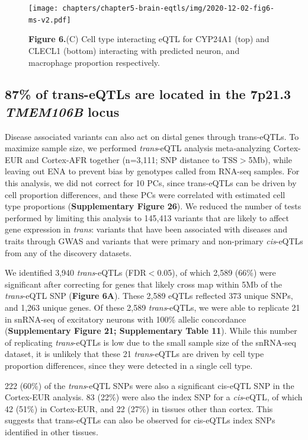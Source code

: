\begin{figure}[H]
	\texttt{[image: chapters/chapter5-brain-eqtls/img/2020-12-02-fig6-ms-v2.pdf]}
	\caption{\textbf{Figure 6.}(C) Cell type interacting eQTL for CYP24A1 (top) and CLECL1 (bottom) interacting with predicted neuron, and macrophage proportion respectively. }
\end{figure}

\subsection{87\% of trans-eQTLs are located in the 7p21.3 \emph{TMEM106B} locus }
Disease associated variants can also act on distal genes through trans-eQTLs. To maximize sample size, we performed \emph{trans}-eQTL analysis meta-analyzing Cortex-EUR and Cortex-AFR together (n=3,111; SNP distance to TSS$>$5Mb), while leaving out ENA to prevent bias by genotypes called from RNA-seq samples. For this analysis, we did not correct for 10 PCs, since trans-eQTLs can be driven by cell proportion differences\cite{vosaUnravelingPolygenicArchitecture2018}, and these PCs were correlated with estimated cell type proportions (\textbf{Supplementary Figure 26}). We reduced the number of tests performed by limiting this analysis to 145,413 variants that are likely to affect gene expression in \emph{trans}: variants that have been associated with diseases and traits through GWAS and variants that were primary and non-primary \emph{cis}-eQTLs from any of the discovery datasets.  

We identified 3,940 \emph{trans}-eQTLs (FDR$<$0.05), of which 2,589 (66\%) were significant after correcting for genes that likely cross map within 5Mb of the \emph{trans}-eQTL SNP (\textbf{Figure 6A}). These 2,589 eQTLs reflected 373 unique SNPs, and 1,263 unique genes. Of these 2,589 \emph{trans}-eQTLs, we were able to replicate 21 in snRNA-seq of excitatory neurons with 100\% allelic concordance (\textbf{Supplementary Figure 21; Supplementary Table 11}). While this number of replicating \emph{trans}-eQTLs is low due to the small sample size of the snRNA-seq dataset, it is unlikely that these 21 \emph{trans}-eQTLs are driven by cell type proportion differences, since they were detected in a single cell type. 

222 (60\%) of the \emph{trans}-eQTL SNPs were also a significant cis-eQTL SNP in the Cortex-EUR analysis. 83 (22\%) were also the index SNP for a \emph{cis}-eQTL, of which 42 (51\%) in Cortex-EUR, and 22 (27\%) in tissues other than cortex. This suggests that trans-eQTLs can also be observed for cis-eQTLs index SNPs identified in other tissues.  

